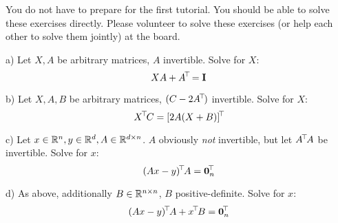 

\renewcommand{\course}{Optimization Algorithms}
\renewcommand{\coursepicture}{optim}
\renewcommand{\coursedate}{Winter 2024/25}
\renewcommand{\exnum}{Weekly Exercise 0}

\exercises

\exercisestitle



You do not have to prepare for the first tutorial. You should be able
to solve these exercises directly. Please volunteer to solve these
exercises (or help each other to solve them jointly) at the board.




a) Let $X,A$ be arbitrary matrices, $A$ invertible. Solve for $X$:
\begin{equation}
 X A + A^{\!\top\!} = {\rm\bf I} 
\end{equation}

b) Let $X,A,B$ be arbitrary matrices, $(C-2A^{\!\top\!})$ invertible. Solve for $X$:
\begin{equation}
 X^{\!\top\!} C = [2 A (X + B)]^{\!\top\!} 
\end{equation}

c) Let $x\in{\mathbb{R}}^n,y\in{\mathbb{R}}^d,A\in{\mathbb{R}}^{d\times n}$. $A$ obviously \emph{not}
invertible, but let $A^{\!\top\!} A$ be invertible. Solve for $x$:
\begin{equation}
 (A x - y)^{\!\top\!} A = \boldsymbol 0_n^{\!\top\!} 
\end{equation}

d) As above, additionally $B\in{\mathbb{R}}^{n\times n}$, $B$
positive-definite. Solve for $x$: 
\begin{equation}
 (A x - y)^{\!\top\!} A + x^{\!\top\!} B = \boldsymbol 0_n^{\!\top\!} 
\end{equation}






